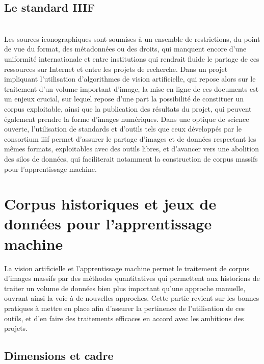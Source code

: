 \documentclass[a4paper,12pt,twoside]{book}
\newcommand{\iiif}{\gls{iiif}\xspace}
\newcommand{\clearemptydoublepage}{\newpage{\pagestyle{empty}\cleardoublepage}}
\begin{document}
                \section{\label{stardardIiif}Le standard IIIF}
                    
        \\
        
        Les sources iconographiques sont soumises à un ensemble de restrictions, du point de vue du format, des métadonnées ou des droits, qui manquent encore d'une uniformité internationale et entre institutions qui rendrait fluide le partage de ces ressources sur Internet et entre les projets de recherche. Dans un projet impliquant l'utilisation d'algorithmes de vision artificielle, qui repose alors sur le traitement d'un volume important d'image, la mise en ligne de ces documents est un enjeux crucial, sur lequel repose d'une part la possibilité de constituer un corpus exploitable, ainsi que la publication des résultats du projet, qui peuvent également prendre la forme d'images numériques. Dans une optique de science ouverte, l'utilisation de standards et d'outils tels que ceux développés par le consortium \iiif permet d'assurer le partage d'images et de données respectant les mêmes formats, exploitables avec des outils libres, et d'avancer vers une abolition des silos de données, qui faciliterait notamment la construction de corpus massifs pour l'apprentissage machine. 
        \clearemptydoublepage
        
        \chapter[Corpus historiques et jeux de données]{Corpus historiques et jeux de données pour l’apprentissage machine}
        
        La vision artificielle et l'apprentissage machine permet le traitement de corpus d'images massifs par des méthodes quantitatives qui permettent aux historiens de traiter un volume de données bien plus important qu'une approche manuelle, ouvrant ainsi la voie à de nouvelles approches. Cette partie revient sur les bonnes pratiques à mettre en place afin d'assurer la pertinence de l'utilisation de ces outils, et d'en faire des traitements efficaces en accord avec les ambitions des projets.
        
                \section{Dimensions et cadre}
                    
            
\end{document}
